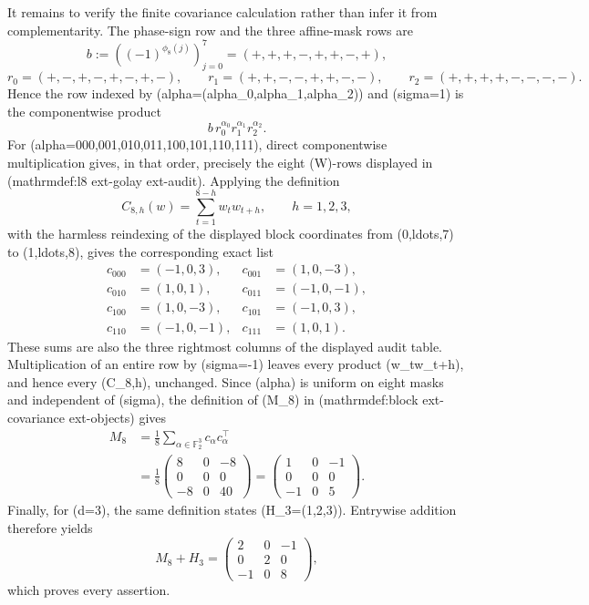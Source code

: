 It remains to verify the finite covariance calculation rather than infer it from complementarity.  The phase-sign row and the three affine-mask rows are
\[
 b:=((-1)^{\phi_8(j)})_{j=0}^7=(+,+,+,-,+,+,-,+),
\]
\[
 r_0=(+,-,+,-,+,-,+,-),\qquad
 r_1=(+,+,-,-,+,+,-,-),\qquad
 r_2=(+,+,+,+,-,-,-,-).
\]
Hence the row indexed by (alpha=(alpha_0,alpha_1,alpha_2)) and (sigma=1) is the componentwise product
\[
 b\,r_0^{\alpha_0}r_1^{\alpha_1}r_2^{\alpha_2}.
\]
For (alpha=000,001,010,011,100,101,110,111), direct componentwise multiplication gives, in that order, precisely the eight (W)-rows displayed in (mathrm{def{:}l8	ext{-}golay	ext{-}audit}).  Applying the definition
\[
 C_{8,h}(w)=\sum_{t=1}^{8-h}w_tw_{t+h},\qquad h=1,2,3,
\]
with the harmless reindexing of the displayed block coordinates from (0,ldots,7) to (1,ldots,8), gives the corresponding exact list
\[
 \begin{split}
 c_{000}&=(-1,0,3),&c_{001}&=(1,0,-3),\\
 c_{010}&=(1,0,1),&c_{011}&=(-1,0,-1),\\
 c_{100}&=(1,0,-3),&c_{101}&=(-1,0,3),\\
 c_{110}&=(-1,0,-1),&c_{111}&=(1,0,1).
 \end{split}
\]
These sums are also the three rightmost columns of the displayed audit table.  Multiplication of an entire row by (sigma=-1) leaves every product (w_tw_{t+h}), and hence every (C_{8,h}), unchanged.  Since (alpha) is uniform on eight masks and independent of (sigma), the definition of (M_8) in (mathrm{def{:}block	ext{-}covariance	ext{-}objects}) gives
\[
 \begin{aligned}
 M_8
 &=\frac18\sum_{\alpha\in\mathbb F_2^3}c_\alpha c_\alpha^{\top}\\
 &=\frac18
 \begin{pmatrix}
 8&0&-8\\
 0&0&0\\
 -8&0&40
 \end{pmatrix}
 =\begin{pmatrix}
 1&0&-1\\
 0&0&0\\
 -1&0&5
 \end{pmatrix}.
 \end{aligned}
\]
Finally, for (d=3), the same definition states (H_3=(1,2,3)).  Entrywise addition therefore yields
\[
 M_8+H_3=
 \begin{pmatrix}
 2&0&-1\\
 0&2&0\\
 -1&0&8
 \end{pmatrix},
\]
which proves every assertion.
